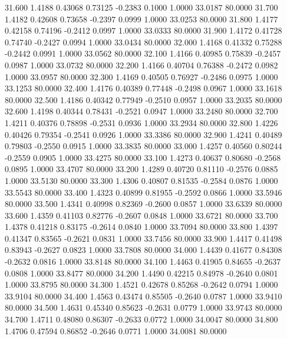   31.600   1.4188   0.43068   0.73125  -0.2383   0.1000   1.0000  33.0187  80.0000
  31.700   1.4182   0.42608   0.73658  -0.2397   0.0999   1.0000  33.0253  80.0000
  31.800   1.4177   0.42158   0.74196  -0.2412   0.0997   1.0000  33.0333  80.0000
  31.900   1.4172   0.41728   0.74740  -0.2427   0.0994   1.0000  33.0434  80.0000
  32.000   1.4168   0.41332   0.75288  -0.2442   0.0991   1.0000  33.0562  80.0000
  32.100   1.4166   0.40985   0.75839  -0.2457   0.0987   1.0000  33.0732  80.0000
  32.200   1.4166   0.40704   0.76388  -0.2472   0.0982   1.0000  33.0957  80.0000
  32.300   1.4169   0.40505   0.76927  -0.2486   0.0975   1.0000  33.1253  80.0000
  32.400   1.4176   0.40389   0.77448  -0.2498   0.0967   1.0000  33.1618  80.0000
  32.500   1.4186   0.40342   0.77949  -0.2510   0.0957   1.0000  33.2035  80.0000
  32.600   1.4198   0.40344   0.78431  -0.2521   0.0947   1.0000  33.2480  80.0000
  32.700   1.4211   0.40376   0.78898  -0.2531   0.0936   1.0000  33.2934  80.0000
  32.800   1.4226   0.40426   0.79354  -0.2541   0.0926   1.0000  33.3386  80.0000
  32.900   1.4241   0.40489   0.79803  -0.2550   0.0915   1.0000  33.3835  80.0000
  33.000   1.4257   0.40560   0.80244  -0.2559   0.0905   1.0000  33.4275  80.0000
  33.100   1.4273   0.40637   0.80680  -0.2568   0.0895   1.0000  33.4707  80.0000
  33.200   1.4289   0.40720   0.81110  -0.2576   0.0885   1.0000  33.5130  80.0000
  33.300   1.4306   0.40807   0.81535  -0.2584   0.0876   1.0000  33.5543  80.0000
  33.400   1.4323   0.40899   0.81955  -0.2592   0.0866   1.0000  33.5946  80.0000
  33.500   1.4341   0.40998   0.82369  -0.2600   0.0857   1.0000  33.6339  80.0000
  33.600   1.4359   0.41103   0.82776  -0.2607   0.0848   1.0000  33.6721  80.0000
  33.700   1.4378   0.41218   0.83175  -0.2614   0.0840   1.0000  33.7094  80.0000
  33.800   1.4397   0.41347   0.83565  -0.2621   0.0831   1.0000  33.7456  80.0000
  33.900   1.4417   0.41498   0.83943  -0.2627   0.0823   1.0000  33.7808  80.0000
  34.000   1.4439   0.41677   0.84308  -0.2632   0.0816   1.0000  33.8148  80.0000
  34.100   1.4463   0.41905   0.84655  -0.2637   0.0808   1.0000  33.8477  80.0000
  34.200   1.4490   0.42215   0.84978  -0.2640   0.0801   1.0000  33.8795  80.0000
  34.300   1.4521   0.42678   0.85268  -0.2642   0.0794   1.0000  33.9104  80.0000
  34.400   1.4563   0.43474   0.85505  -0.2640   0.0787   1.0000  33.9410  80.0000
  34.500   1.4631   0.45340   0.85623  -0.2631   0.0779   1.0000  33.9743  80.0000
  34.700   1.4711   0.48080   0.86307  -0.2633   0.0772   1.0000  34.0047  80.0000
  34.800   1.4706   0.47594   0.86852  -0.2646   0.0771   1.0000  34.0081  80.0000

